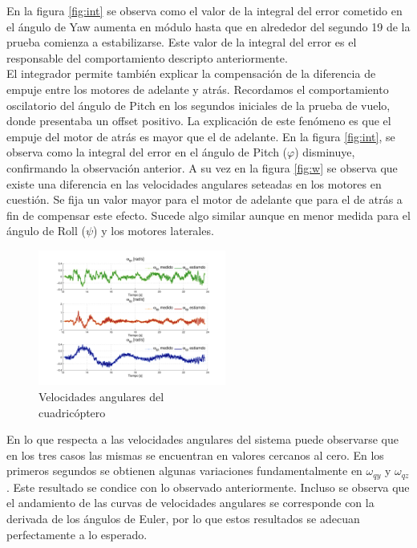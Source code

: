 \documentclass[main]{subfiles}
\begin{document}
En la figura \ref{fig:int} se observa como el valor de la integral del error cometido en el \'angulo de Yaw aumenta en m\'odulo hasta que en alrededor del segundo 19 de la prueba comienza a estabilizarse. Este valor de la integral del error es el responsable del comportamiento descripto anteriormente.\\

El integrador permite tambi\'en explicar la compensaci\'on de la diferencia de empuje entre los motores de adelante y atr\'as. Recordamos el comportamiento oscilatorio del \'angulo de Pitch en los segundos iniciales de la prueba de vuelo, donde presentaba un offset positivo. La explicaci\'on de este fen\'omeno es que el empuje del motor de atr\'as es mayor que el de adelante. En la figura \ref{fig:int}, se observa como la integral del error en el \'angulo de Pitch ($\varphi$) disminuye, confirmando la observaci\'on anterior. A su vez en la figura \ref{fig:w} se observa que existe una diferencia en las velocidades angulares seteadas en los motores en cuesti\'on. Se fija un valor mayor para el motor de adelante que para el de atr\'as a fin de compensar este efecto. Sucede algo similar aunque en menor medida para el \'angulo de Roll ($\psi$) y los motores laterales.\\ 

\begin{figure}
	\centering
	\vspace{-10pt}
	\includegraphics[width=0.55\textwidth]{./pics_test_control/wq.pdf}
	\caption{Velocidades angulares del\\cuadricóptero}
	\label{fig:wq}
\end{figure}

En lo que respecta a las velocidades angulares del sistema puede observarse que en los tres casos las mismas se encuentran en valores cercanos al cero. En los primeros segundos se obtienen algunas variaciones fundamentalmente en $\omega_{qy}$ y $\omega_{qz}$. Este resultado se condice con lo observado anteriormente. Incluso se observa que el andamiento de las curvas de velocidades angulares se corresponde con la derivada de los \'angulos de Euler, por lo que estos resultados se adecuan perfectamente a lo esperado.\\
\end{document}
